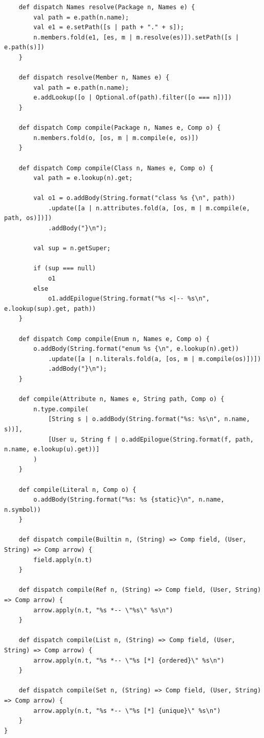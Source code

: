 \documentclass{article}
\begin{document}
\begin{verbatim}
    def dispatch Names resolve(Package n, Names e) {
        val path = e.path(n.name);
        val e1 = e.setPath([s | path + "." + s]);
        n.members.fold(e1, [es, m | m.resolve(es)]).setPath([s | e.path(s)])
    }

    def dispatch resolve(Member n, Names e) {
        val path = e.path(n.name);
        e.addLookup([o | Optional.of(path).filter([o === n])])
    }

    def dispatch Comp compile(Package n, Names e, Comp o) {
        n.members.fold(o, [os, m | m.compile(e, os)])
    }

    def dispatch Comp compile(Class n, Names e, Comp o) {        
        val path = e.lookup(n).get;

        val o1 = o.addBody(String.format("class %s {\n", path))
            .update([a | n.attributes.fold(a, [os, m | m.compile(e, path, os)])])
            .addBody("}\n");

        val sup = n.getSuper;

        if (sup === null)
            o1
        else
            o1.addEpilogue(String.format("%s <|-- %s\n", e.lookup(sup).get, path))
    }

    def dispatch Comp compile(Enum n, Names e, Comp o) {
        o.addBody(String.format("enum %s {\n", e.lookup(n).get))
            .update([a | n.literals.fold(a, [os, m | m.compile(os)])])
            .addBody("}\n");
    }

    def compile(Attribute n, Names e, String path, Comp o) {
        n.type.compile(
            [String s | o.addBody(String.format("%s: %s\n", n.name, s))],
            [User u, String f | o.addEpilogue(String.format(f, path, n.name, e.lookup(u).get))]
        )
    }

    def compile(Literal n, Comp o) {
        o.addBody(String.format("%s: %s {static}\n", n.name, n.symbol))
    }

    def dispatch compile(Builtin n, (String) => Comp field, (User, String) => Comp arrow) {
        field.apply(n.t)
    }

    def dispatch compile(Ref n, (String) => Comp field, (User, String) => Comp arrow) {
        arrow.apply(n.t, "%s *-- \"%s\" %s\n")
    }

    def dispatch compile(List n, (String) => Comp field, (User, String) => Comp arrow) {
        arrow.apply(n.t, "%s *-- \"%s [*] {ordered}\" %s\n")
    }

    def dispatch compile(Set n, (String) => Comp field, (User, String) => Comp arrow) {
        arrow.apply(n.t, "%s *-- \"%s [*] {unique}\" %s\n")
    }
}
\end{verbatim}
\end{document}
